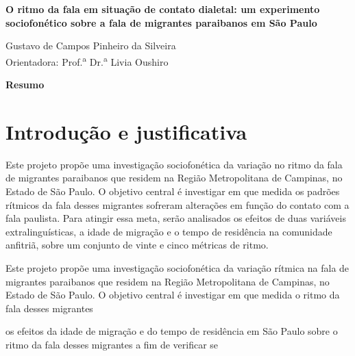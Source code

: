 \documentclass[
			a4paper,		%
			12pt,			%
			oneside,
			]{article}		%
\begin{document}
	
{ %
	\begin{center}
		{\bfseries\Large\sffamily
			O ritmo da fala em situação de contato dialetal: um experimento sociofonético 
			sobre a fala de migrantes paraibanos em São Paulo
		}
	\end{center}
}
	
	\vspace{0.35em}
{ %
	\begin{flushright} 
		Gustavo de Campos Pinheiro da Silveira \\ 
		\vspace{5pt}
		Orientadora: Prof.\textsuperscript{a} Dr.\textsuperscript{a} Livia Oushiro
	\end{flushright}

	\begin{center} 
	    {\bfseries\sffamily Resumo} \\ 
	\end{center}
	 \par
	\vspace{0.35em}
		
}

\section{Introdução e justificativa}

Este projeto propõe uma investigação sociofonética da variação no ritmo da fala de 
migrantes paraibanos que residem na Região Metropolitana de Campinas, no Estado de São 
Paulo. O objetivo central é investigar em que medida os padrões rítmicos da fala desses 
migrantes sofreram alterações em função do contato com a fala paulista. Para atingir essa 
meta, serão analisados os efeitos de duas variáveis extralinguísticas, a idade de 
migração e o tempo de residência na comunidade anfitriã, sobre um conjunto de vinte e 
cinco métricas de ritmo.  


Este projeto propõe uma investigação sociofonética da variação rítmica na fala de 
migrantes paraibanos que residem na Região Metropolitana de Campinas, no Estado de São 
Paulo. O objetivo central é investigar em que medida o ritmo da fala desses migrantes 

os efeitos da idade de migração e do tempo de residência em São Paulo sobre o ritmo da 
fala desses migrantes a fim de verificar se 
\end{document}
